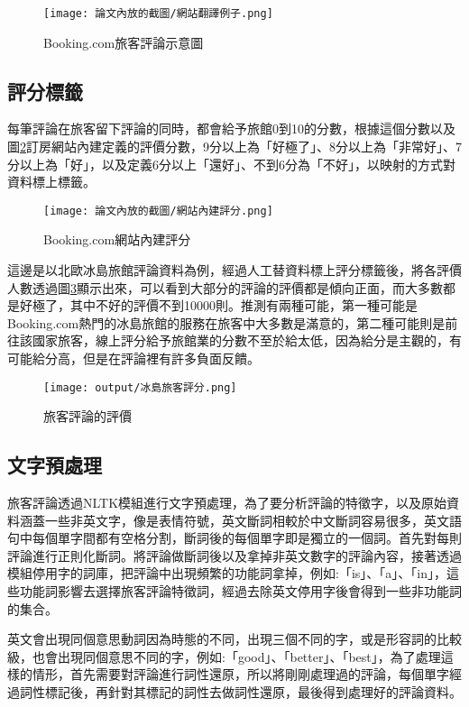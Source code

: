 	\begin{figure}[H]
	\centering
	\texttt{[image: 論文內放的截圖/網站翻譯例子.png]}
	\caption{Booking.com旅客評論示意圖}
	\label{Fi3g4}
	\end{figure}

\subsection{評分標籤}

	每筆評論在旅客留下評論的同時，都會給予旅館0到10的分數，根據這個分數以及圖\ref{Fi3g5}訂房網站內建定義的評價分數，9分以上為「好極了」、8分以上為「非常好」、7分以上為「好」，以及定義6分以上「還好」、不到6分為「不好」，以映射的方式對資料標上標籤。\\
	
	\begin{figure}[H]
	\centering
	\texttt{[image: 論文內放的截圖/網站內建評分.png]}
	\caption{Booking.com網站內建評分}
	\label{Fi3g5}
	\end{figure}
	
	
	 這邊是以北歐冰島旅館評論資料為例，經過人工替資料標上評分標籤後，將各評價人數透過圖\ref{Fi3g6}顯示出來，可以看到大部分的評論的評價都是傾向正面，而大多數都是好極了，其中不好的評價不到10000則。推測有兩種可能，第一種可能是Booking.com熱門的冰島旅館的服務在旅客中大多數是滿意的，第二種可能則是前往該國家旅客，線上評分給予旅館業的分數不至於給太低，因為給分是主觀的，有可能給分高，但是在評論裡有許多負面反饋。
	 
	\begin{figure}[H]
	\centering
	\texttt{[image: output/冰島旅客評分.png]}
	\caption{旅客評論的評價}
	\label{Fi3g6}
	\end{figure}
	
\newpage
	 
\subsection{文字預處理}

	旅客評論透過NLTK模組進行文字預處理，為了要分析評論的特徵字，以及原始資料涵蓋一些非英文字，像是表情符號，英文斷詞相較於中文斷詞容易很多，英文語句中每個單字間都有空格分割，斷詞後的每個單字即是獨立的一個詞。首先對每則評論進行正則化斷詞。將評論做斷詞後以及拿掉非英文數字的評論內容，接著透過模組停用字的詞庫，把評論中出現頻繁的功能詞拿掉，例如:「is」、「a」、「in」，這些功能詞影響去選擇旅客評論特徵詞，經過去除英文停用字後會得到一些非功能詞的集合。
	
	英文會出現同個意思動詞因為時態的不同，出現三個不同的字，或是形容詞的比較級，也會出現同個意思不同的字，例如:「good」、「better」、「best」，為了處理這樣的情形，首先需要對評論進行詞性還原，所以將剛剛處理過的評論，每個單字經過詞性標記後，再針對其標記的詞性去做詞性還原，最後得到處理好的評論資料。\\
	
